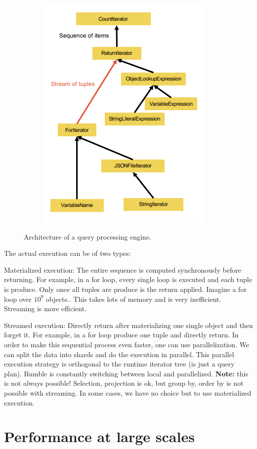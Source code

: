 \documentclass[11pt,oneside,a4paper]{article}
\begin{document}
{\begin{figure}[t!]
\begin{subfigure}[t]{.3\textwidth}
	\end{subfigure}
	\begin{subfigure}[t]{.3\textwidth}
		\centering
		\includegraphics[width=0.4\linewidth]{figures/querytrees_processing_5}
	\end{subfigure}
	\caption{Architecture of a query processing engine.}
	\vspace*{-6mm}
\end{figure}

The actual execution can be of two types:

\begin{compactitem}
\item Materialized execution: The entire sequence is computed synchronously before returning. For example, in a for loop, every single loop is executed and each tuple is produce. Only once all tuples are produce is the return applied. Imagine a for loop over $10^9$ objects.. This takes lots of memory and is very inefficient. Streaming is more efficient.
\item Streamed execution: Directly return after materializing one single object and then forget it. For example, in a for loop produce one tuple and directly return. In order to make this sequential process even faster, one can use parallelization. We can split the data into shards and do the execution in parallel. This parallel execution strategy is orthogonal to the runtime iterator tree (is just a query plan). Rumble is constantly switching between local and parallelized. \textbf{Note:} this is not always possible! Selection, projection is ok, but group by, order by is not possible with streaming. In some cases, we have no choice but to use materialized execution.
\end{compactitem}

\section{ Performance at large scales}

}
\end{document}
